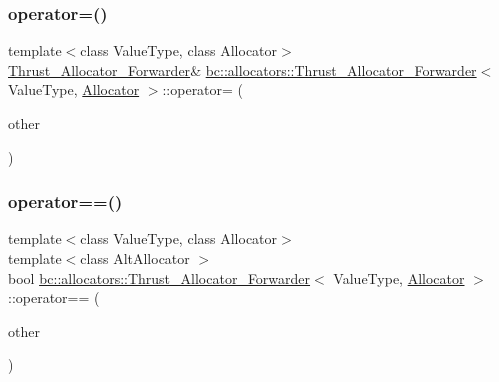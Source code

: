 \mbox{\label{structbc_1_1allocators_1_1Thrust__Allocator__Forwarder_a285d08cd74d4d45a3892dad8b6f29dcb}} 
\subsubsection{\texorpdfstring{operator=()}{operator=()}\hspace{0.1cm}{\footnotesize\ttfamily [2/2]}}
{\footnotesize\ttfamily template$<$class Value\+Type, class Allocator$>$ \\
\hyperlink{structbc_1_1allocators_1_1Thrust__Allocator__Forwarder}{Thrust\+\_\+\+Allocator\+\_\+\+Forwarder}\& \hyperlink{structbc_1_1allocators_1_1Thrust__Allocator__Forwarder}{bc\+::allocators\+::\+Thrust\+\_\+\+Allocator\+\_\+\+Forwarder}$<$ Value\+Type, \hyperlink{classbc_1_1allocators_1_1Allocator}{Allocator} $>$\+::operator= (\begin{DoxyParamCaption}\item[{\hyperlink{structbc_1_1allocators_1_1Thrust__Allocator__Forwarder}{Thrust\+\_\+\+Allocator\+\_\+\+Forwarder}$<$ Value\+Type, \hyperlink{classbc_1_1allocators_1_1Allocator}{Allocator} $>$ \&\&}]{other }\end{DoxyParamCaption})\hspace{0.3cm}{\ttfamily [inline]}}

\mbox{\label{structbc_1_1allocators_1_1Thrust__Allocator__Forwarder_ab3bbe1ac6dcd53281d99450bc8d09934}} 
\subsubsection{\texorpdfstring{operator==()}{operator==()}}
{\footnotesize\ttfamily template$<$class Value\+Type, class Allocator$>$ \\
template$<$class Alt\+Allocator $>$ \\
bool \hyperlink{structbc_1_1allocators_1_1Thrust__Allocator__Forwarder}{bc\+::allocators\+::\+Thrust\+\_\+\+Allocator\+\_\+\+Forwarder}$<$ Value\+Type, \hyperlink{classbc_1_1allocators_1_1Allocator}{Allocator} $>$\+::operator== (\begin{DoxyParamCaption}\item[{const Alt\+Allocator \&}]{other }\end{DoxyParamCaption})\hspace{0.3cm}{\ttfamily [inline]}}

